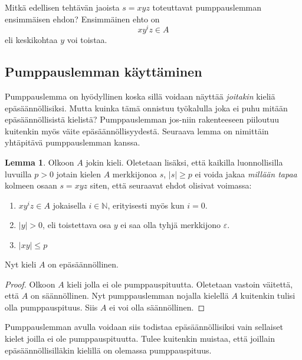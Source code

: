 \documentclass[a4paper,11pt]{article}
\theoremstyle{definition}
\newtheorem*{lemma}{Lemma}
\newcommand{\Nat}{\mathbb{N}}
\begin{document}
\begin{exercise}
    Mitkä edellisen tehtävän jaoista $s = xyz$ toteuttavat pumppauslemman
    ensimmäisen ehdon? Ensimmäinen ehto on
    \begin{equation*}
        xy^iz \in A
    \end{equation*}
    eli keskikohtaa $y$ voi toistaa.
\end{exercise}

\subsection*{Pumppauslemman käyttäminen}

Pumppauslemma on hyödyllinen koska sillä voidaan näyttää \emph{joitakin} kieliä
epäsäännöllisiksi. Mutta kuinka tämä onnistuu työkalulla joka ei puhu
mitään epäsäännöllisistä kielistä? Pumppauslemman jos-niin
rakenteeseen piiloutuu kuitenkin myös väite epäsäännöllisyydestä.
Seuraava lemma on nimittäin yhtäpitävä pumppauslemman kanssa.

\begin{lemma}
  Olkoon $A$ jokin kieli. Oletetaan lisäksi, että kaikilla
  luonnollisilla luvuilla $p > 0$ jotain kielen $A$ merkkijonoa $s$,
  $|s| \ge p$ ei voida jakaa \emph{millään tapaa} kolmeen osaan $s =
  xyz$ siten, että seuraavat ehdot olisivat voimassa:
  \begin{enumerate}
  \item
    $xy^iz \in A$ jokaisella $i \in \Nat$, erityisesti myös kun $i =
    0$.
  \item
    $|y| > 0$, eli toistettava osa $y$ ei saa olla tyhjä merkkijono
    $\varepsilon$.
  \item
    $|xy| \leq p$
  \end{enumerate}
  Nyt kieli $A$ on epäsäännöllinen.
\end{lemma}
\begin{proof}
  Olkoon $A$ kieli jolla ei ole pumppauspituutta. Oletetaan vastoin
  väitettä, että $A$ on säännöllinen. Nyt pumppauslemman nojalla
  kielellä $A$ kuitenkin tulisi olla pumppauspituus. Siis $A$ ei voi
  olla säännöllinen.
\end{proof}

Pumppauslemman avulla voidaan siis todistaa epäsäännöllisiksi vain
sellaiset kielet joilla ei ole pumppauspituutta. Tulee kuitenkin
muistaa, että joillain epäsäännöllisilläkin kielillä on olemassa
pumppauspituus.
\end{document}
